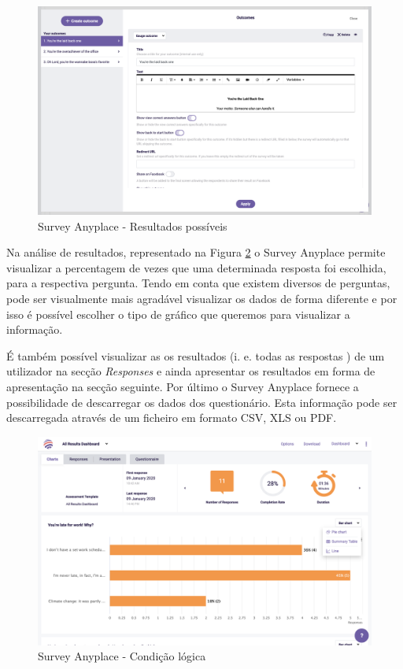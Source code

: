\begin{figure}[ht!]
	\begin{center}
		\includegraphics[width=1\textwidth]{img/sap/outcome}
		\caption{Survey Anyplace - Resultados possíveis}
		\label{fig:sap-outcome}
	\end{center}
\end{figure}
\newpage

Na análise de resultados, representado na Figura \ref{fig:sap-results} o Survey Anyplace permite visualizar a percentagem de vezes que uma determinada resposta foi escolhida, para a respectiva pergunta. Tendo em conta que existem diversos de perguntas, pode ser visualmente mais agradável visualizar os dados de forma diferente e por isso é possível escolher o tipo de gráfico que queremos para visualizar a informação. 

É também possível visualizar as os resultados (i. e. todas as respostas ) de um utilizador na secção \textit{Responses} e ainda apresentar os resultados em forma de apresentação na secção seguinte. Por último o Survey Anyplace fornece a possibilidade de descarregar os dados dos questionário. Esta informação pode ser descarregada através de um ficheiro em formato CSV, XLS ou PDF.

\newpage

\begin{figure}[ht!]
	\begin{center}
		\includegraphics[width=1\textwidth]{img/sap/results}
		\caption{Survey Anyplace - Condição lógica}
		\label{fig:sap-results}
	\end{center}
\end{figure}



